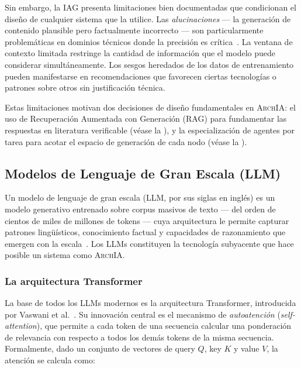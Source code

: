 \documentclass[12pt, letterpaper, oneside]{article}
\newcommand{\archia}{\textsc{ArchIA}}
\begin{document}
Sin embargo, la IAG presenta limitaciones bien documentadas que condicionan el
diseño de cualquier sistema que la utilice. Las \emph{alucinaciones} --- la
generación de contenido plausible pero factualmente incorrecto --- son
particularmente problemáticas en dominios técnicos donde la precisión es
crítica~\cite{zhao2023survey}. La ventana de contexto limitada restringe la
cantidad de información que el modelo puede considerar simultáneamente. Los sesgos
heredados de los datos de entrenamiento pueden manifestarse en recomendaciones que
favorecen ciertas tecnologías o patrones sobre otros sin justificación técnica.

Estas limitaciones motivan dos decisiones de diseño fundamentales en \archia{}: el
uso de Recuperación Aumentada con Generación (RAG) para fundamentar las respuestas
en literatura verificable (véase la ), y la especialización de
agentes por tarea para acotar el espacio de generación de cada nodo (véase la
).


\subsection{Modelos de Lenguaje de Gran Escala (LLM)}
\label{subsec:llm}


Un modelo de lenguaje de gran escala (LLM, por sus siglas en inglés) es un modelo
generativo entrenado sobre corpus masivos de texto --- del orden de cientos de
miles de millones de tokens --- cuya arquitectura le permite capturar patrones
lingüísticos, conocimiento factual y capacidades de razonamiento que emergen con
la escala~\cite{zhao2023survey}. Los LLMs constituyen la tecnología subyacente que
hace posible un sistema como \archia{}.

\subsubsection{La arquitectura Transformer}

La base de todos los LLMs modernos es la arquitectura Transformer, introducida por
Vaswani et al.~\cite{vaswani2017attention}. Su innovación central es el mecanismo
de \emph{autoatención} (\emph{self-attention}), que permite a cada token de una
secuencia calcular una ponderación de relevancia con respecto a todos los demás
tokens de la misma secuencia. Formalmente, dado un conjunto de vectores de query
$Q$, key $K$ y value $V$, la atención se calcula como:
\end{document}
